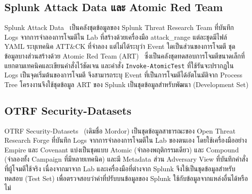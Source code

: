 \subsection{Splunk Attack Data และ Atomic Red Team}
Splunk Attack Data~\cite{splunk-attack-data} เป็นคลังชุดข้อมูลของ Splunk Threat Research Team
ที่บันทึก Logs จากการจำลองการโจมตีใน Lab ที่สร้างด้วยเครื่องมือ attack\_range
แต่ละชุดมีไฟล์ YAML ระบุเทคนิค ATT\&CK ที่จำลอง แต่ไม่ได้ระบุว่า Event ใดเป็นส่วนของการโจมตี
ชุดข้อมูลบางส่วนสร้างด้วย Atomic Red Team (ART)~\cite{atomic-red-team}
ซึ่งเป็นคลังชุดทดสอบการโจมตีขนาดเล็กที่แยกตามเทคนิคและเขียนคำสั่งไว้ชัดเจน
และคำสั่ง \texttt{Invoke-AtomicTest} ที่ใช้รันจะปรากฏใน Logs เป็นจุดเริ่มต้นของการโจมตี
จึงสามารถระบุ Event ที่เป็นการโจมตีได้อัตโนมัติจาก Process Tree
โครงงานจึงใช้ชุดข้อมูล ART ของ Splunk เป็นชุดข้อมูลสำหรับพัฒนา (Development Set)

\subsection{OTRF Security-Datasets}
OTRF Security-Datasets~\cite{otrf-security-datasets} (เดิมชื่อ Mordor) เป็นชุดข้อมูลสาธารณะของ Open Threat Research Forge
ที่บันทึก Logs จากการจำลองการโจมตีใน Lab ของตนเอง โดยใช้เครื่องมืออย่าง Empire และ Covenant
แบ่งเป็นชุดแบบ Atomic (จำลองพฤติกรรมเดียว) และ Compound (จำลองทั้ง Campaign ที่มีหลายเทคนิค)
และมี Metadata ส่วน Adversary View ที่บันทึกคำสั่งที่ผู้โจมตีใช้จริง
เนื่องจากมาจาก Lab และเครื่องมือที่ต่างจาก Splunk จึงใช้เป็นชุดข้อมูลสำหรับทดสอบ (Test Set)
เพื่อตรวจสอบว่าค่าที่ปรับบนข้อมูลของ Splunk ใช้กับข้อมูลจากแหล่งอื่นได้หรือไม่

